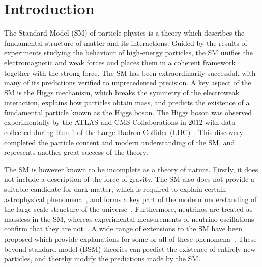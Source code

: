\chapter{Introduction}
\label{chap:intro}

The Standard Model (SM) of particle physics is a theory which describes
the fundamental structure of matter and its interactions.
Guided by the results of experiments studying the behaviour of high-energy particles, 
the SM unifies the electromagnetic and weak forces and places them in a coherent framework
together with the strong force.
The SM has been extraordinarily successful, 
with many of its predictions verified to unprecedented precision.
A key aspect of the SM is the Higgs mechanism, 
which breaks the symmetry of the electroweak interaction, explains how particles obtain mass, 
and predicts the existence of a fundamental particle known as the Higgs boson.
The Higgs boson was observed experimentally by the ATLAS and CMS Collaborations in 2012
with data collected during Run 1 of the Large Hadron Collider (LHC)~\cite{ATLASdiscovery,CMSdiscovery}.
This discovery completed the particle content and modern understanding of the SM, 
and represents another great success of the theory.

The SM is however known to be incomplete as a theory of nature.
Firstly, it does not include a description of the force of gravity.
The SM also does not provide a suitable candidate for dark matter, 
which is required to explain certain astrophysical phenomena~\cite{BulletCluster},
and forms a key part of the modern understanding 
of the large scale structure of the universe~\cite{Planck}.
Furthermore, neutrinos are treated as massless in the SM, 
whereas experimental measurements of neutrino oscillations confirm that they are not~\cite{NeutrinoOscillation}.
A wide range of extensions to the SM have been proposed 
which provide explanations for some or all of these phenomena~\cite{SUSY}.
These beyond standard model (BSM) theories can predict the existence of entirely new particles, 
and thereby modify the predictions made by the SM.

